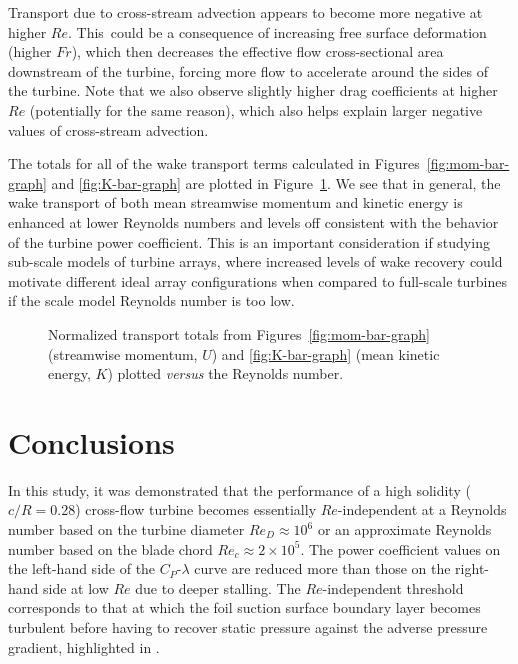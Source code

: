 Transport due to cross-stream advection appears to become more negative at
higher $Re$. This~could be a consequence of increasing free surface deformation
(higher $Fr$), which then decreases the effective flow cross-sectional area
downstream of the turbine, forcing more flow to accelerate around the sides of
the turbine. Note that we also observe slightly higher drag coefficients at
higher $Re$ (potentially for the same reason), which also helps explain larger
negative values of cross-stream advection.

The totals for all of the wake transport terms calculated in
Figures~\ref{fig:mom-bar-graph} and \ref{fig:K-bar-graph} are plotted in
Figure~\ref{fig:wake-trans-totals}. We see that in general, the wake transport
of both mean streamwise momentum and kinetic energy is enhanced at lower
Reynolds numbers and levels off consistent with the behavior of the turbine
power coefficient. This is an important consideration if studying sub-scale
models of turbine arrays, where increased levels of wake recovery could motivate
different ideal array configurations when compared to full-scale turbines if the
scale model Reynolds number is too low.

\begin{figure}[ht]
    \centering
    
    
    \caption{Normalized transport totals from Figures~\ref{fig:mom-bar-graph}
        (streamwise momentum, $U$) and \ref{fig:K-bar-graph} (mean kinetic energy,
        $K$) plotted \textit{versus} the Reynolds number.}
    
    \label{fig:wake-trans-totals}
\end{figure}


\section{Conclusions}

In this study, it was demonstrated that the performance of a high solidity
($c/R=0.28$) cross-flow turbine becomes essentially $Re$-independent at a
Reynolds number based on the turbine diameter $Re_D \approx 10^6$ or an
approximate Reynolds number based on the blade chord $Re_c \approx 2 \times
10^5$. The power coefficient values on the left-hand side of the $C_P$-$\lambda$
curve are reduced more than those on the right-hand side at low $Re$ due to
deeper stalling. The $Re$-independent threshold corresponds to that at which the
foil suction surface boundary layer becomes turbulent before having to recover
static pressure against the adverse pressure gradient, highlighted in
\cite{Lissaman1983, McMasters1980, Carmichael1981}.

